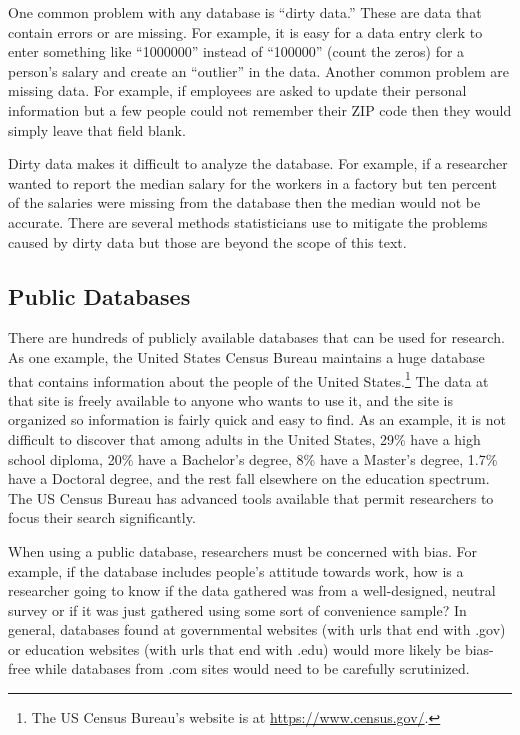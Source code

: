 One common problem with any database is ``dirty data.'' These are data that contain errors or are missing. For example, it is easy for a data entry clerk to enter something like ``1000000'' instead of ``100000'' (count the zeros) for a person's salary and create an ``outlier'' in the data. Another common problem are missing data. For example, if employees are asked to update their personal information but a few people could not remember their ZIP code then they would simply leave that field blank.

Dirty data makes it difficult to analyze the database. For example, if a researcher wanted to report the median salary for the workers in a factory but ten percent of the salaries were missing from the database then the median would not be accurate. There are several methods statisticians use to mitigate the problems caused by dirty data but those are beyond the scope of this text. 

\subsection{Public Databases}

There are hundreds of publicly available databases that can be used for research. As one example, the United States Census Bureau maintains a huge database that contains information about the people of the United States.\footnote{The US Census Bureau's website is at \url{https://www.census.gov/}.} The data at that site is freely available to anyone who wants to use it, and the site is organized so information is fairly quick and easy to find. As an example, it is not difficult to discover that among adults in the United States, 29\% have a high school diploma, 20\% have a Bachelor's degree, 8\% have a Master's degree, 1.7\% have a Doctoral degree, and the rest fall elsewhere on the education spectrum. The US Census Bureau has advanced tools available that permit researchers to focus their search significantly.

When using a public database, researchers must be concerned with bias. For example, if the database includes people's attitude towards work, how is a researcher going to know if the data gathered was from a well-designed, neutral survey or if it was just gathered using some sort of convenience sample? In general, databases found at governmental websites (with urls that end with .gov) or education websites (with urls that end with .edu) would more likely be bias-free while databases from .com sites would need to be carefully scrutinized.

